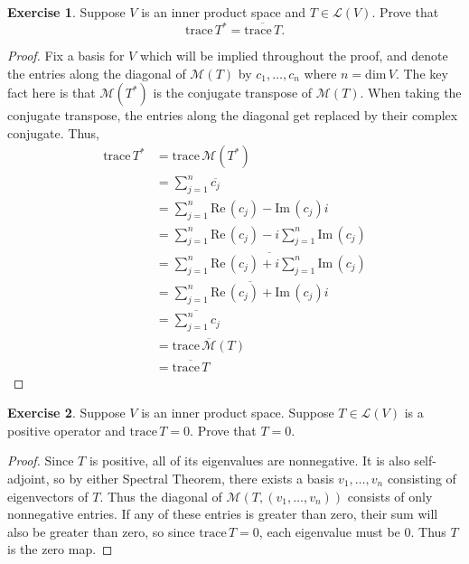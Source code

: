 \documentclass{article}
\theoremstyle{definition}
\newtheorem{ex}{Exercise}
\begin{document}
\begin{ex}
	Suppose $V$ is an inner product space and $T \in \mathcal{L}(V)$.
	Prove that \begin{equation*}
		\mathrm{trace}\,T^* = \overline{\mathrm{trace}\,T}.
	\end{equation*}
\end{ex}
\begin{proof}
	Fix a basis for $V$ which will be implied throughout the proof, and denote the entries along the diagonal of $\mathcal{M}(T)$ by $c_1, \dots, c_n$ where $n = \mathrm{dim}\,V$.
	The key fact here is that $\mathcal{M}(T^*)$ is the conjugate transpose of $\mathcal{M}(T)$.
	When taking the conjugate transpose, the entries along the diagonal get replaced by their complex conjugate.
	Thus, \begin{align*}
		\mathrm{trace}\,T^* & = \mathrm{trace}\,\mathcal{M}(T^*)                                                       \\
		                    & = \sum _{j = 1}^{n} \overline{c_j}                                                       \\
		                    & = \sum _{j = 1}^{n} \mathrm{Re}\,(c_j) - \mathrm{Im}\,(c_j)i                             \\
		                    & = \sum _{j = 1}^{n} \mathrm{Re}\,(c_j) - i\sum _{j = 1}^{n} \mathrm{Im}\,(c_j)           \\
		                    & = \overline{\sum _{j = 1}^{n}\mathrm{Re}\,(c_j) + i\sum _{j = 1}^{n} \mathrm{Im}\,(c_j)} \\
		                    & = \overline{\sum _{j = 1}^{n}\mathrm{Re}\,(c_j) + \mathrm{Im}\,(c_j)i}                   \\
		                    & = \overline{\sum _{j = 1}^{n}c_j}                                                        \\
		                    & = \overline{\mathrm{trace}\,\mathcal{M}(T)}                                              \\
		                    & = \overline{\mathrm{trace}\,T}
	\end{align*}
\end{proof}

\begin{ex}
	Suppose $V$ is an inner product space.
	Suppose $T \in \mathcal{L}(V)$ is a positive operator and $\mathrm{trace}\,T = 0$.
	Prove that $T = 0$.
\end{ex}
\begin{proof}
	Since $T$ is positive, all of its eigenvalues are nonnegative.
	It is also self-adjoint, so by either Spectral Theorem, there exists a basis $v_1, \dots, v_n$ consisting of eigenvectors of $T$.
	Thus the diagonal of $\mathcal{M}(T, (v_1, \dots, v_n))$ consists of only nonnegative entries.
	If any of these entries is greater than zero, their sum will also be greater than zero, so since $\mathrm{trace}\,T = 0$, each eigenvalue must be $0$.
	Thus $T$ is the zero map.
\end{proof}
\end{document}

